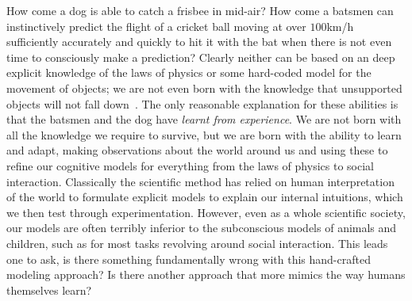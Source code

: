 
How come a dog is able to catch a
frisbee in mid-air? How come a batsmen can instinctively predict the flight of a cricket ball
moving at over $100$km/h sufficiently accurately and quickly to hit it with the bat when there
is not even time to consciously make a prediction?  Clearly neither can be based on an
deep explicit knowledge of the laws of physics or some hard-coded model for the movement
of objects; we are not even born with the knowledge that unsupported objects will not 
fall down~\citep{baillargeon2002acquisition}.  The only reasonable explanation for these
abilities is that the batsmen and the dog have \emph{learnt from experience}.  We are
not born with all the knowledge we require to survive, but we are born with the
ability to learn and adapt, making observations about the world around us and using these
to refine our cognitive models for everything from the laws of physics to social interaction.
Classically the scientific method has relied on human interpretation of the world to formulate
explicit models to explain our internal intuitions, which we then test
through experimentation.  However, even as a whole scientific society, our models
are often terribly inferior to the subconscious models of animals and children, such as for most
tasks revolving around social interaction.  This leads one to ask, is there something fundamentally
wrong with this hand-crafted modeling approach?  Is there another approach that more mimics the
way humans themselves learn?

